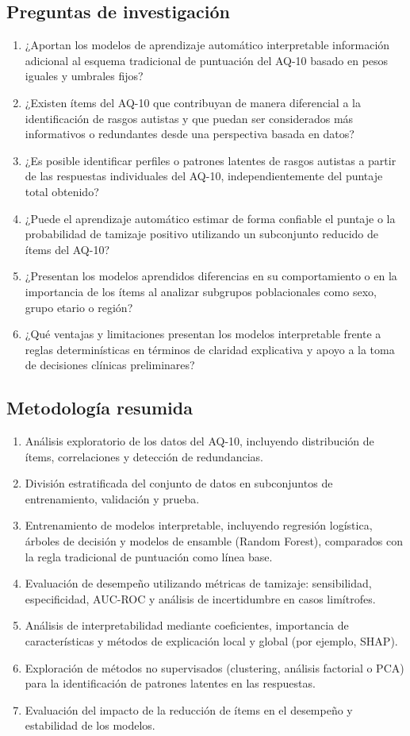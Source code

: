 \subsection{Preguntas de investigación}
\begin{enumerate}[leftmargin=*,noitemsep]
  \item ¿Aportan los modelos de aprendizaje automático interpretable información adicional al esquema tradicional de puntuación del AQ-10 basado en pesos iguales y umbrales fijos?
  \item ¿Existen ítems del AQ-10 que contribuyan de manera diferencial a la identificación de rasgos autistas y que puedan ser considerados más informativos o redundantes desde una perspectiva basada en datos?
  \item ¿Es posible identificar perfiles o patrones latentes de rasgos autistas a partir de las respuestas individuales del AQ-10, independientemente del puntaje total obtenido?
  \item ¿Puede el aprendizaje automático estimar de forma confiable el puntaje o la probabilidad de tamizaje positivo utilizando un subconjunto reducido de ítems del AQ-10?
  \item ¿Presentan los modelos aprendidos diferencias en su comportamiento o en la importancia de los ítems al analizar subgrupos poblacionales como sexo, grupo etario o región?
  \item ¿Qué ventajas y limitaciones presentan los modelos interpretable frente a reglas determinísticas en términos de claridad explicativa y apoyo a la toma de decisiones clínicas preliminares?
\end{enumerate}

\subsection{Metodología resumida}
\begin{enumerate}[leftmargin=*,noitemsep]
  \item Análisis exploratorio de los datos del AQ-10, incluyendo distribución de ítems, correlaciones y detección de redundancias.
  \item División estratificada del conjunto de datos en subconjuntos de entrenamiento, validación y prueba.
  \item Entrenamiento de modelos interpretable, incluyendo regresión logística, árboles de decisión y modelos de ensamble (Random Forest), comparados con la regla tradicional de puntuación como línea base.
  \item Evaluación de desempeño utilizando métricas de tamizaje: sensibilidad, especificidad, AUC-ROC y análisis de incertidumbre en casos limítrofes.
  \item Análisis de interpretabilidad mediante coeficientes, importancia de características y métodos de explicación local y global (por ejemplo, SHAP).
  \item Exploración de métodos no supervisados (clustering, análisis factorial o PCA) para la identificación de patrones latentes en las respuestas.
  \item Evaluación del impacto de la reducción de ítems en el desempeño y estabilidad de los modelos.
\end{enumerate}

